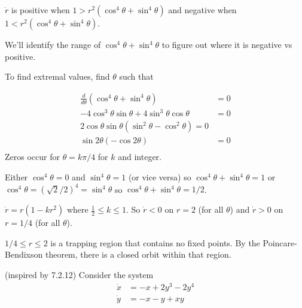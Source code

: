 \documentclass[12pt,letterpaper,noanswers]{exam}
\begin{document}
\begin{questions}
\begin{parts}
\begin{solution}
$\dot r$ is positive when $1>r^2(\cos^4\theta + \sin^4\theta)$ and negative when $1<r^2(\cos^4\theta + \sin^4\theta)$.

We'll identify the range of $\cos^4\theta + \sin^4\theta$ to figure out where it is negative vs positive.

To find extremal values, find $\theta$ such that 

\begin{align*}
    \frac{d}{d\theta} (\cos^4\theta + \sin^4\theta) &= 0 \\
    -4\cos^3\theta\sin\theta+4\sin^3\theta\cos\theta &= 0 \\
    2\cos\theta\sin\theta(\sin^2\theta - \cos^2\theta) = 0 \\
    \sin 2\theta (-\cos 2\theta) &= 0 \\
\end{align*}
Zeros occur for $\theta = k\pi/4$ for $k$ and integer.

Either $\cos^4 \theta = 0$ and $\sin^4\theta = 1$ (or vice versa) so $\cos^4\theta + \sin^4\theta = 1$ or $\cos^4\theta = (\sqrt{2}/2)^4 = \sin^4\theta$ so $\cos^4\theta + \sin^4\theta = 1/2$.

$\dot r = r(1-k r^2)$ where  $\frac{1}{2}\leq k \leq 1$.  So $\dot r < 0$ on $r = 2$ (for all $\theta$) and $\dot r>0$ on $r = 1/4$ (for all $\theta$).

$1/4 \leq r \leq 2$ is a trapping region that contains no fixed points.  By the Poincare-Bendixson theorem, there is a closed orbit within that region.

\end{solution}


\end{parts}






\question (inspired by 7.2.12) Consider the system
\begin{align*}
\dot{x} &= -x + 2y^3-2y^4 \\ 
\dot{y} &= -x-y+xy
\end{align*}
\end{questions}
\end{document}

